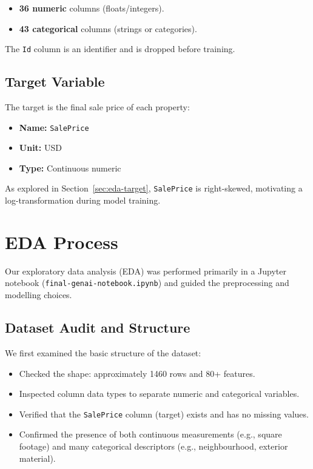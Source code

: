 \documentclass[11pt,a4paper]{article}
\begin{document}
\begin{itemize}[leftmargin=*]
    \item \textbf{36 numeric} columns (floats/integers).
    \item \textbf{43 categorical} columns (strings or categories).
\end{itemize}

The \texttt{Id} column is an identifier and is dropped before training.

\subsection{Target Variable}

The target is the final sale price of each property:

\begin{itemize}[leftmargin=*]
    \item \textbf{Name:} \texttt{SalePrice}
    \item \textbf{Unit:} USD
    \item \textbf{Type:} Continuous numeric
\end{itemize}

As explored in Section~\ref{sec:eda-target}, \texttt{SalePrice} is right-skewed, motivating a log-transformation during model training.

\section{EDA Process}

Our exploratory data analysis (EDA) was performed primarily in a Jupyter notebook (\texttt{final-genai-notebook.ipynb}) and guided the preprocessing and modelling choices.

\subsection{Dataset Audit and Structure}

We first examined the basic structure of the dataset:

\begin{itemize}[leftmargin=*]
    \item Checked the shape: approximately 1460 rows and 80+ features.
    \item Inspected column data types to separate numeric and categorical variables.
    \item Verified that the \texttt{SalePrice} column (target) exists and has no missing values.
    \item Confirmed the presence of both continuous measurements (e.g., square footage) and many categorical descriptors (e.g., neighbourhood, exterior material).
\end{itemize}
\end{document}
